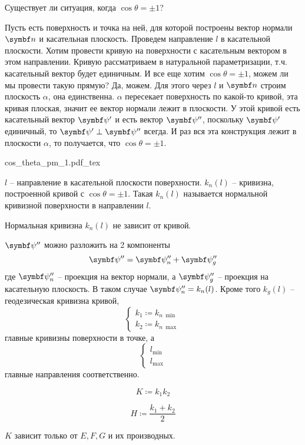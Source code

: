 \documentclass[main]{subfiles}
\begin{document}
Существует ли ситуация, когда $\cos\theta = \pm 1$?

Пусть есть поверхность и точка на ней, для которой построены вектор нормали $\vn$ и касательная плоскость.
Проведем направление $l$  в касательной плоскости.
Хотим провести кривую на поверхности с касательным вектором в этом направлении.
Кривую рассматриваем в натуральной параметризации, т.ч. касательный вектор будет единичным.
И все еще хотим  $\cos\theta = \pm 1$, можем ли мы провести такую прямую?
Да, можем.
Для этого через $l$ и $\vn$ строим плоскость $\alpha$, она единственна.
$\alpha$ пересекает поверхность по какой-то кривой, эта кривая плоская, значит ее вектор нормали лежит в плоскости.
У этой кривой есть касательный вектор $\vpsi'$ и есть вектор $\vpsi''$, поскольку $\vpsi'$ единичный, то $\vpsi' \perp \vpsi''$ всегда.
И раз вся эта конструкция лежит в плоскости $\alpha$, то получается, что $\cos\theta = \pm 1$.
\begin{center}
    {cos_theta_pm_1.pdf_tex}
\end{center}

\begin{definition}
    $l$ -- направление в касательной плоскости поверхности.
    $k_{n}(l)$ -- кривизна, построенной кривой с $\cos\theta = \pm 1$.
    Такая $k_{n}(l)$ называется нормальной кривизной поверхности в направлении $l$.
\end{definition}
\begin{theorem}[Мёнье]
    Нормальная кривизна $k_{n}(l)$ не зависит от кривой.
\end{theorem}

$\vpsi''$ можно разложить на 2 компоненты
\[\vpsi'' = \vpsi''_{n} + \vpsi''_{g}\]
где $\vpsi''_{n}$ -- проекция на вектор нормали, а $\vpsi''_{g}$ -- проекция на касательную плоскость.
В таком случае $\vpsi''_{n} = k_{n}(l)$.
Кроме того $k_{g}(l)$ -- геодезическая кривизна кривой,
\[\begin{cases}
        k_1 \coloneqq k_{n\ \min} \\
        k_2 \coloneqq k_{n\ \max}
    \end{cases}\]
главные кривизны поверхности в точке, а
\[\begin{cases}
        l_{\min} \\
        l_{\max}
    \end{cases}\]
главные направления соответственно.

\begin{definition}
    \[K \coloneqq k_1k_2 \]
\end{definition}
\begin{definition}
    \[H \coloneqq \frac{k_1 + k_2}{2}\]
\end{definition}
\begin{theorem}
    $K$ зависит только от $E,F,G$ и их производных.
\end{theorem}
\end{document}
